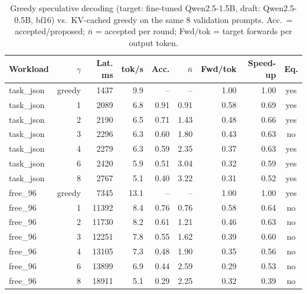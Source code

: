 \begin{table}[t]
\centering
\footnotesize
\caption{Greedy speculative decoding (target: fine-tuned Qwen2.5-1.5B, draft: Qwen2.5-0.5B, bf16) vs.\ KV-cached greedy on the same 8 validation prompts. Acc.\ = accepted/proposed; $\bar n$ = accepted per round; Fwd/tok = target forwards per output token.}
\label{tab:spec}
\begin{tabular}{lrrrrrrrc}
\toprule
Workload & $\gamma$ & Lat. ms & tok/s & Acc. & $\bar n$ & Fwd/tok & Speed-up & Eq. \\
\midrule
task\_json & greedy & 1437 & 9.9 & -- & -- & 1.00 & 1.00 & yes \\
task\_json & 1 & 2089 & 6.8 & 0.91 & 0.91 & 0.58 & 0.69 & yes \\
task\_json & 2 & 2190 & 6.5 & 0.71 & 1.43 & 0.48 & 0.66 & yes \\
task\_json & 3 & 2296 & 6.3 & 0.60 & 1.80 & 0.43 & 0.63 & no \\
task\_json & 4 & 2279 & 6.3 & 0.59 & 2.35 & 0.37 & 0.63 & yes \\
task\_json & 6 & 2420 & 5.9 & 0.51 & 3.04 & 0.32 & 0.59 & yes \\
task\_json & 8 & 2767 & 5.1 & 0.40 & 3.22 & 0.31 & 0.52 & yes \\
free\_96 & greedy & 7345 & 13.1 & -- & -- & 1.00 & 1.00 & yes \\
free\_96 & 1 & 11392 & 8.4 & 0.76 & 0.76 & 0.58 & 0.64 & no \\
free\_96 & 2 & 11730 & 8.2 & 0.61 & 1.21 & 0.46 & 0.63 & no \\
free\_96 & 3 & 12251 & 7.8 & 0.55 & 1.62 & 0.39 & 0.60 & no \\
free\_96 & 4 & 13105 & 7.3 & 0.48 & 1.90 & 0.35 & 0.56 & no \\
free\_96 & 6 & 13899 & 6.9 & 0.44 & 2.59 & 0.29 & 0.53 & no \\
free\_96 & 8 & 18911 & 5.1 & 0.29 & 2.25 & 0.32 & 0.39 & no \\
\bottomrule
\end{tabular}
\end{table}
